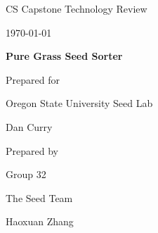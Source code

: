 \documentclass[onecolumn, draftclsnofoot,10pt, compsoc]{IEEEtran}
\def \CapstoneTeamName{		The Seed Team}
\def \CapstoneTeamNumber{		32}
\def \GroupMemberOne{			Bharath Padmaraju}
\def \GroupMemberTwo{			Kevin Deming}
\def \GroupMemberFive{			Haoxuan Zhang}
\def \GroupMemberFour{			Cong Yang}
\def \GroupMemberThree{			Christopher Wohlwend}
\def \CapstoneProjectName{		Pure Grass Seed Sorter}
\def \CapstoneSponsorCompany{	Oregon State University Seed Lab}
\def \CapstoneSponsorPerson{		Dan Curry}
\def \DocType{	%
				Technology Review
				}
\newcommand{\NameSigPair}[1]{\par
\makebox[2.75in][r]{#1} \hfil 	\makebox[3.25in]{\makebox[2.25in]{\hrulefill} \hfill		\makebox[.75in]{\hrulefill}}
\par\vspace{-12pt} \textit{\tiny\noindent
\makebox[2.75in]{} \hfil		\makebox[3.25in]{\makebox[2.25in][r]{Signature} \hfill	\makebox[.75in][r]{Date}}}}
\renewcommand{\NameSigPair}[1]{#1}
\begin{document}
\begin{titlepage}
    \begin{singlespace}
        \hfill 
        \par\vspace{.2in}
        \centering
        \scshape{
            \huge CS Capstone \DocType \par
            {\large\today}\par
            \vspace{.5in}
            \textbf{\Huge\CapstoneProjectName}\par
            \vfill
            {\large Prepared for}\par
            \Huge \CapstoneSponsorCompany\par
            \vspace{5pt}
            {\Large\NameSigPair{\CapstoneSponsorPerson}\par}
            {\large Prepared by }\par
            Group\CapstoneTeamNumber\par
            \CapstoneTeamName\par 
            \vspace{5pt}
            {\Large
                \NameSigPair{\GroupMemberFive}\par
            }
            \vspace{20pt}
        }

    \end{singlespace}
\end{titlepage}
\newpage
{}
\tableofcontents
\clearpage
\end{document}
